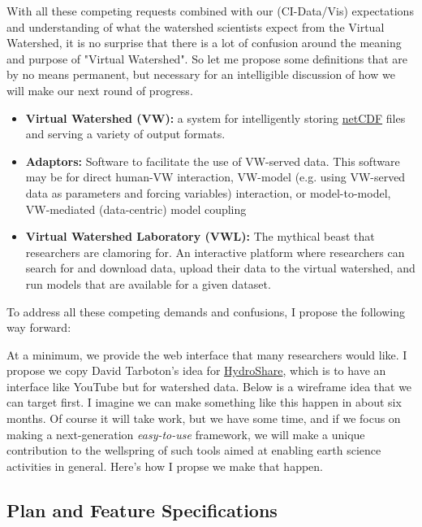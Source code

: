 \documentclass[
11pt, %
a4paper, %
oneside, %
twoside, %
headinclude,footinclude, %
BCOR5mm, %
]{scrartcl}
\begin{document}
With all these competing requests combined with our (CI-Data/Vis) expectations and understanding
of what the watershed scientists expect from the Virtual Watershed, it is no surprise that
there is a lot of confusion around the meaning and purpose of "Virtual Watershed". So let me
propose some definitions that are by no means permanent, but necessary for an intelligible discussion
of how we will make our next round of progress.

\begin{itemize}
    \item \textbf{Virtual Watershed (VW):} a system for intelligently storing 
        \href{http://www.unidata.ucar.edu/software/netcdf/}{netCDF} files and serving
        a variety of output formats. 
    \item \textbf{Adaptors:} Software to facilitate the use of VW-served data. This software may
        be for direct human-VW interaction, VW-model (e.g. using VW-served data as parameters and 
        forcing variables) interaction, or model-to-model, VW-mediated (data-centric) model 
        coupling
    \item \textbf{Virtual Watershed Laboratory (VWL):} The mythical beast that researchers are
        clamoring for. An interactive platform where researchers can search for and download data,
        upload their data to the virtual watershed, and run models that are available for a given
        dataset.
\end{itemize}

To address all these competing demands and confusions, I propose the following way forward:

At a minimum, we provide the web interface that many researchers would like. I propose we
copy David Tarboton's idea for \href{http://www.iemss.org/sites/iemss2014/papers/iemss2014_submission_243.pdf}{HydroShare}, 
which is to have an interface like YouTube but for watershed data. Below is a wireframe idea
that we can target first. I imagine we can make something like this happen in about six months. 
Of course it will take work, but we have some time, and if we focus on making a next-generation
\textit{easy-to-use} framework, we will make a unique contribution to the wellspring of such tools
aimed at enabling earth science activities in general. Here's how I propse we make that happen.



\subsection{Plan and Feature Specifications} %
\label{sub:Plan}
\end{document}
